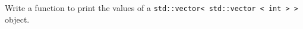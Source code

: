 \begin{ex} Write a function to print the values of a \verb!std::vector< std::vector < int > >! object.
\end{ex}
